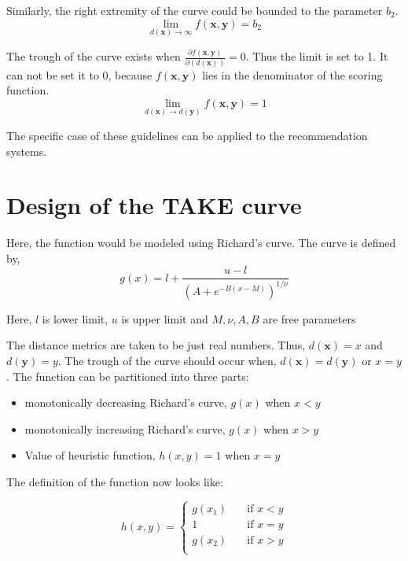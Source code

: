 Similarly, the right extremity of the curve could be bounded to the parameter $b_2$.
\begin{equation} \label{c5}
\lim_{d(\mathbf{x})\to \infty} f(\mathbf{x}, \mathbf{y}) = b_2
\end{equation}

The trough of the curve exists when $\frac{\partial f(\mathbf{x}, \mathbf{y})}{\partial ( d(\mathbf{x}) )} = 0$. Thus the limit is set to 1. It can not be set it to 0, because $f(\mathbf{x}, \mathbf{y})$ lies in the denominator of the scoring function.
\begin{equation} \label{c6}
\lim_{d(\mathbf{x})\to d(\mathbf{y})} f(\mathbf{x}, \mathbf{y}) = 1
\end{equation}

The specific case of these guidelines can be applied to the recommendation systems.


\section{Design of the TAKE curve}

Here, the function would be modeled using Richard's curve. The curve is defined by,
\begin{equation}
g(x) = l + \frac{u - l}{(A + e^{{-B(x-M)}})^{{1/\nu }}}
\end{equation}

Here, $l$ is lower limit, $u$ is upper limit and $M, \nu, A, B$ are free parameters

The distance metrics are taken to be just real numbers. Thus, $d(\mathbf{x}) = x$ and $d(\mathbf{y}) = y$. The trough of the curve should occur when, $d(\mathbf{x}) = d(\mathbf{y})$ or $x = y$. The function can be partitioned into three parts:
\begin{itemize}
	\item monotonically decreasing Richard's curve, $g(x)$  when $x < y$
	\item monotonically increasing Richard's curve, $g(x)$ when $x > y$
	\item Value of heuristic function, $h(x, y) = 1$  when $x = y$
\end{itemize}

The definition of the function now looks like:

\begin{equation}
h(x, y) = 
\begin{cases}
g(x_1)       & \quad \text{if } x < y\\
1 & \quad \text{if } x = y\\
g(x_2)  & \quad \text{if } x > y\\
\end{cases}
\end{equation}

